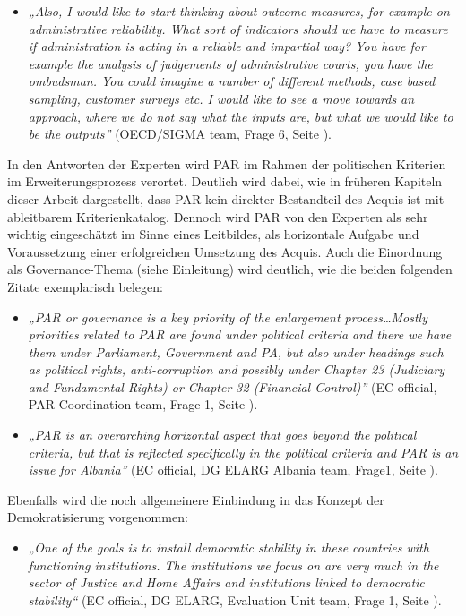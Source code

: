 \begin{itemize}[label={}]
\item \textit{„Also, I would like to start thinking about outcome measures, for example on administrative reliability. What sort of indicators should we have to measure if administration is acting in a reliable and impartial way? You have for example the analysis of judgements of administrative courts, you have the ombudsman. You could imagine a number of different methods, case based sampling, customer surveys etc. I would like to see a move towards an approach, where we do not say what the inputs are, but what we would like to be the outputs”} (OECD/SIGMA team, Frage 6, Seite \pageref{sec:chapter}).
\end{itemize}


In den Antworten der Experten wird PAR im Rahmen der politischen Kriterien im Erweiterungsprozess verortet. Deutlich wird dabei, wie in früheren Kapiteln dieser Arbeit dargestellt, dass PAR kein direkter Bestandteil des Acquis ist mit ableitbarem Kriterienkatalog. Dennoch wird PAR von den Experten als sehr wichtig eingeschätzt im Sinne eines Leitbildes, als horizontale Aufgabe und Voraussetzung einer erfolgreichen Umsetzung des Acquis. Auch die Einordnung als Governance-Thema (siehe Einleitung) wird deutlich, wie die beiden folgenden Zitate exemplarisch belegen: 

\begin{itemize}[label={}]
\item \textit{„PAR or governance is a key priority of the enlargement process…Mostly priorities related to PAR are found under political criteria and there we have them under Parliament, Government and PA, but also under headings such as political rights, anti-corruption and possibly under Chapter 23 (Judiciary and Fundamental Rights) or Chapter 32 (Financial Control)”} (EC official, PAR Coordination team, Frage 1, Seite \pageref{sec:there}).
\item \textit{„PAR is an overarching horizontal aspect that goes beyond the political criteria, but that is reflected specifically in the political criteria and PAR is an issue for Albania”} (EC official, DG ELARG Albania team, Frage1, Seite \pageref{sec:there}).
\end{itemize}

Ebenfalls wird die noch allgemeinere Einbindung in das Konzept der Demokratisierung vorgenommen:
\begin{itemize}[label={}]
\item \textit{„One of the goals is to install democratic stability in these countries with functioning institutions. The institutions we focus on are very much in the sector of Justice and Home Affairs and institutions linked to democratic stability“} (EC official, DG ELARG, Evaluation Unit team, Frage 1, Seite \pageref{sec:there}).
\end{itemize}

